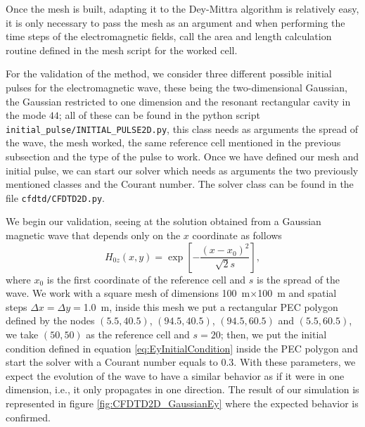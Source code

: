 \documentclass[12pt, oneside]{book}
\begin{document}
Once the mesh is built, adapting it to the Dey-Mittra algorithm is relatively easy, it is only necessary to pass the mesh as an argument and when performing the time steps of the electromagnetic fields, call the area and length calculation routine defined in the mesh script for the worked cell. 

For the validation of the method, we consider three different possible initial pulses for the electromagnetic wave, these being the two-dimensional Gaussian, the Gaussian restricted to one dimension and the resonant rectangular cavity in the mode $44$; all of these can be found in the python script \texttt{initial\_pulse/INITIAL\_PULSE2D.py}, this class needs as arguments the spread of the wave, the mesh worked, the same reference cell mentioned in the previous subsection and the type of the pulse to work. Once we have defined our mesh and initial pulse, we can start our solver which needs as arguments the two previously mentioned classes and the Courant number. The solver class can be found in the file \texttt{cfdtd/CFDTD2D.py}.

We begin our validation, seeing at the solution obtained from a Gaussian magnetic wave that depends only on the $x$ coordinate as follows
\begin{equation}
    H_{0z}(x,y) = \exp \left[ - \dfrac{(x - x_0)^2}{\sqrt{2} s} \right],
\label{eq:EyInitialCondition}
\end{equation}
where $x_0$ is the first coordinate of the reference cell and $s$ is the spread of the wave. We work with a square mesh of dimensions \qty{100}{\metre}$\times$\qty{100}{\metre} and spatial steps $\Delta x = \Delta y =$\qty{1.0}{\metre}, inside this mesh we put a rectangular PEC polygon defined by the nodes $(5.5,40.5)$, $(94.5,40.5)$, $(94.5, 60.5)$ and $(5.5, 60.5)$, we take $(50, 50)$ as the reference cell and $s=20$; then, we put the initial condition defined in equation \ref{eq:EyInitialCondition} inside the PEC polygon and start the solver with a Courant number equals to $0.3$. With these parameters, we expect the evolution of the wave to have a similar behavior as if it were in one dimension, i.e., it only propagates in one direction. The result of our simulation is represented in figure \ref{fig:CFDTD2D_GaussianEy} where the expected behavior is confirmed.
\end{document}
